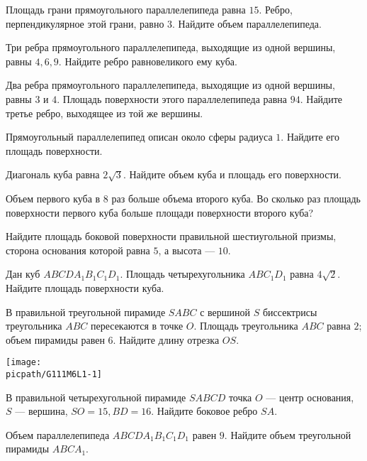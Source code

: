 %
%

\begin{class}[number=1]
	\begin{listofex}
		\item Площадь грани прямоугольного параллелепипеда равна \( 15 \). Ребро, перпендикулярное этой грани, равно \(3\). Найдите объем параллелепипеда.
		\item Три ребра прямоугольного параллелепипеда, выходящие из одной вершины, равны \(4, 6, 9\). Найдите ребро равновеликого ему куба.
		\item Два ребра прямоугольного параллелепипеда, выходящие из одной вершины, равны \(3\) и \(4\). Площадь поверхности этого параллелепипеда равна \(94\). Найдите третье ребро, выходящее из той же вершины.
		\item Прямоугольный параллелепипед описан около сферы радиуса \(1\). Найдите его площадь поверхности.
		\item Диагональ куба равна \( 2\sqrt{3} \). Найдите объем куба и площадь его поверхности.
		\item Объем первого куба в \( 8 \) раз больше объема второго куба. Во сколько раз площадь поверхности первого куба больше площади поверхности второго куба?
		\item Найдите площадь боковой поверхности правильной шестиугольной призмы, сторона основания которой равна \( 5 \), а высота  --- \( 10 \).
		\item Дан куб \( ABCDA_1B_1C_1D_1 \). Площадь четырехугольника \( ABC_1D_1 \) равна \( 4\sqrt{2} \). Найдите площадь поверхности куба.
		\item 
		\begin{minipage}[t]{\bodywidth}
			В правильной треугольной пирамиде \(SABC\) с вершиной \(S\) биссектрисы треугольника \(ABC\) пересекаются в точке \(O\). Площадь треугольника \(ABC\) равна \(2\); объем пирамиды равен \(6\). Найдите длину отрезка \(OS\).
		\end{minipage}
		\hspace{0.02\linewidth}
		\begin{minipage}[t]{\picwidth}
			\texttt{[image: \\picpath/G111M6L1-1]}
		\end{minipage}
		\item В правильной четырехугольной пирамиде \(SABCD\) точка \(O\) --- центр основания, \(S\) --- вершина, \(SO=15, BD=16\). Найдите боковое ребро \(SA\).
		\item Объем параллелепипеда \(ABCDA_1B_1C_1D_1\) равен \(9\). Найдите объем треугольной пирамиды \(ABCA_1\).

\end{listofex}
\end{class}
